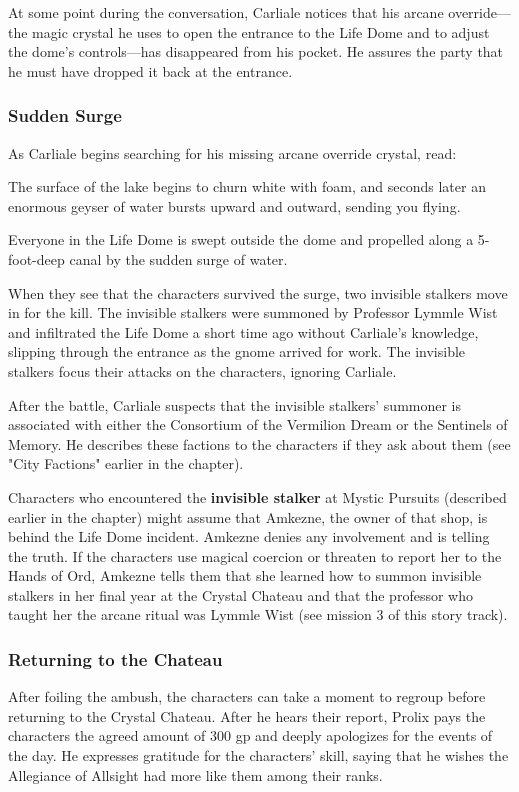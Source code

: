 \documentclass[10pt,a4paper,twoside,bg=print,twocolumn,openany,nodeprecatedcode]{dndbook}
\begin{document}
At some point during the conversation, Carliale notices that his arcane override—the magic crystal he uses to open the entrance to the Life Dome and to adjust the dome's controls—has disappeared from his pocket. He assures the party that he must have dropped it back at the entrance.

\subsubsection{Sudden Surge}
As Carliale begins searching for his missing arcane override crystal, read:

\begin{DndReadAloud}{}
The surface of the lake begins to churn white with foam, and seconds later an enormous geyser of water bursts upward and outward, sending you flying.

\end{DndReadAloud}

Everyone in the Life Dome is swept outside the dome and propelled along a 5-foot-deep canal by the sudden surge of water.

When they see that the characters survived the surge, two invisible stalkers move in for the kill. The invisible stalkers were summoned by Professor Lymmle Wist and infiltrated the Life Dome a short time ago without Carliale's knowledge, slipping through the entrance as the gnome arrived for work. The invisible stalkers focus their attacks on the characters, ignoring Carliale.

After the battle, Carliale suspects that the invisible stalkers' summoner is associated with either the Consortium of the Vermilion Dream or the Sentinels of Memory. He describes these factions to the characters if they ask about them (see "City Factions" earlier in the chapter).

Characters who encountered the \textbf{invisible stalker} at Mystic Pursuits (described earlier in the chapter) might assume that Amkezne, the owner of that shop, is behind the Life Dome incident. Amkezne denies any involvement and is telling the truth. If the characters use magical coercion or threaten to report her to the Hands of Ord, Amkezne tells them that she learned how to summon invisible stalkers in her final year at the Crystal Chateau and that the professor who taught her the arcane ritual was Lymmle Wist (see mission 3 of this story track).

\subsubsection{Returning to the Chateau}
After foiling the ambush, the characters can take a moment to regroup before returning to the Crystal Chateau. After he hears their report, Prolix pays the characters the agreed amount of 300 gp and deeply apologizes for the events of the day. He expresses gratitude for the characters' skill, saying that he wishes the Allegiance of Allsight had more like them among their ranks.
\end{document}
